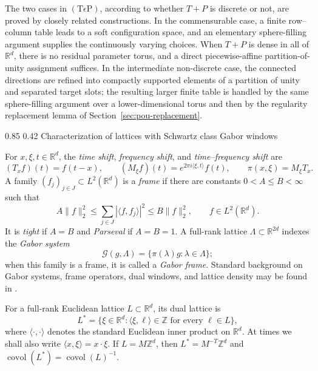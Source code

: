 \documentclass[11pt,reqno]{amsart}
\makeatletter
\numberwithin{equation}{section}
\renewcommand\subsection{\@startsection{subsection}{2}{\z@}%
  {0.85\baselineskip \@plus 0.25\baselineskip \@minus 0.10\baselineskip}%
  {0.42\baselineskip}%
  {\normalfont\bfseries}}
\theoremstyle{definition}
\theoremstyle{remark}
\newcommand{\R}{\mathbb R}
\newcommand{\Z}{\mathbb Z}
\newcommand{\covol}{\operatorname{covol}}
\newcommand{\G}{\mathcal G}
\newcommand{\ip}[2]{\langle #1,#2\rangle}
\newcommand{\norm}[1]{\lVert #1\rVert}
\newcommand{\TeP}{\ensuremath{(\mathrm{T}\epsilon\mathrm{P})}\xspace}
\makeatother
\begin{document}
The two cases in \TeP, according to whether $T+P$ is discrete or not,
are proved by closely related constructions.  In the commensurable case, a
finite row--column table leads to a soft configuration space, and an elementary
sphere-filling argument supplies the continuously varying choices.  When
$T+P$ is dense in all of $\R^d$, there is no residual parameter torus, and a direct piecewise-affine
partition-of-unity assignment suffices.  In the intermediate non-discrete
case, the connected directions are refined into compactly supported elements
of a partition of unity and separated target slots; the resulting larger
finite table is handled by
the same sphere-filling argument over a lower-dimensional torus and then by the
regularity replacement lemma of Section~\ref{sec:pou-replacement}.

\subsection{Characterization of lattices with Schwartz class Gabor windows}
\label{subsec:intro-gabor}

For $x,\xi,t\in\R^d$, the \emph{time shift},
\emph{frequency shift}, and \emph{time--frequency shift} are
\[
 (T_xf)(t)=f(t-x),
 \qquad
 (M_\xi f)(t)=e^{2\pi i\ip{\xi}{t}}f(t),
 \qquad
 \pi(x,\xi)=M_\xi T_x.
\]
A family $(f_j)_{j\in J}\subset L^2(\R^d)$ is a \emph{frame} if there are
constants $0<A\le B<\infty$ such that
\[
 A\norm{f}_2^2
 \le \sum_{j\in J}|\ip{f}{f_j}|^2
 \le B\norm{f}_2^2
 ,\qquad f\in L^2(\R^d).
\]
It is \emph{tight} if $A=B$ and \emph{Parseval} if $A=B=1$.  A full-rank
lattice $\Lambda\subset\R^{2d}$ indexes the \emph{Gabor system}
\[
 \G(g,\Lambda)=\{\pi(\lambda)g:\lambda\in\Lambda\};
\]
when this family is a frame, it is called a \emph{Gabor frame}.  Standard
background on Gabor systems, frame operators, dual windows, and lattice
density may be found in \cite[Chapters~5--7]{Grochenig2001}.

For a full-rank Euclidean lattice $L\subset\R^d$, its dual lattice is
\[
 L^*=\{\xi\in\R^d:\ip{\xi}{\ell}\in\Z
       \text{ for every }\ell\in L\},
\]
where $\ip{\cdot}{\cdot}$ denotes the standard Euclidean inner product on
$\R^d$.  At times we shall also write $\ip{x}{\xi}=x\cdot\xi$.  If
$L=M\Z^d$, then $L^*=M^{-T}\Z^d$ and
$\covol(L^*)=\covol(L)^{-1}$.
\end{document}
